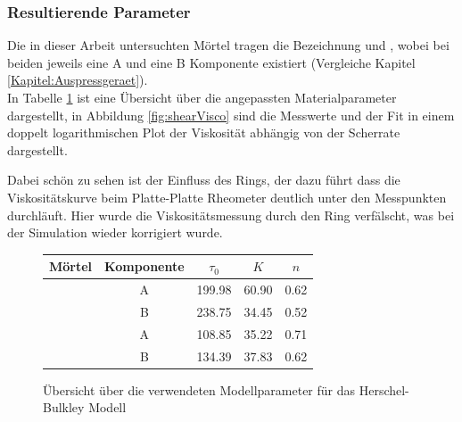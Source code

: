 \subsubsection{Resultierende Parameter}
Die in dieser Arbeit untersuchten Mörtel tragen die Bezeichnung \hit{} und \re{}, wobei bei beiden jeweils eine A und eine B Komponente existiert (Vergleiche Kapitel \ref{Kapitel:Auspressgeraet}).\\
In Tabelle \ref{fig:resultParameter} ist eine Übersicht über die angepassten Materialparameter dargestellt, in Abbildung \ref{fig:shearVisco} sind die Messwerte und der Fit in einem doppelt logarithmischen Plot der Viskosität abhängig von der Scherrate dargestellt.

Dabei schön zu sehen ist der Einfluss des Rings, der dazu führt dass die Viskositätskurve beim Platte-Platte Rheometer deutlich unter den Messpunkten durchläuft.
Hier wurde die Viskositätsmessung durch den Ring verfälscht, was bei der Simulation wieder korrigiert wurde.
\begin{figure}
    \centering
    \begin{tabular}{l c l l l}
        \textbf{Mörtel} & \textbf{Komponente} & 
        \multicolumn{1}{c}{$\tau_0$} &
        \multicolumn{1}{c}{$K$} &
        \multicolumn{1}{c}{$n$} \\
        \hline
        \hline
        \multirow{2}{*}{\hit{}} & A & 199.98& 60.90& 0.62\\ 
        & B & 238.75& 34.45& 0.52\\ 
        \hline
        \multirow{2}{*}{\re{}}  & A & 108.85& 35.22& 0.71\\ 
        & B & 134.39& 37.83& 0.62
    \end{tabular}
    \caption{Übersicht über die verwendeten Modellparameter für das Herschel-Bulkley Modell}
    \label{fig:resultParameter}
\end{figure}
%
